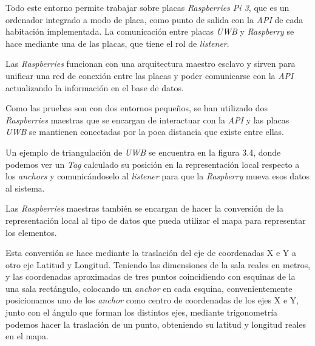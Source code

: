 Todo este entorno permite trabajar sobre placas \textit{Raspberries Pi 3}, que es un ordenador integrado a modo de placa, como punto de salida con la \textit{API} de cada habitación implementada. La comunicación entre placas \textit{UWB} y \textit{Raspberry} se hace mediante una de las placas, que tiene el rol de \textit{listener}.

Las \textit{Raspberries} funcionan con una arquitectura maestro esclavo y sirven para unificar una red de conexión entre las placas y poder comunicarse con la \textit{API} actualizando la información en el base de datos.

Como las pruebas son con dos entornos pequeños, se han utilizado dos \textit{Raspberries} maestras que se encargan de interactuar con la \textit{API} y las placas \textit{UWB} se mantienen conectadas por la poca distancia que existe entre ellas.

Un ejemplo de triangulación de \textit{UWB} se encuentra en la figura 3.4, donde podemos ver un \textit{Tag} calculado su posición en la representación local respecto a los \textit{anchors} y comunicándoselo al \textit{listener} para que la \textit{Raspberry} mueva esos datos al sistema.





Las \textit{Raspberries} maestras también se encargan de hacer la conversión de la representación local al tipo de datos que pueda utilizar el mapa para representar los elementos.

Esta conversión se hace mediante la traslación del eje de coordenadas X e Y a otro eje Latitud y Longitud. Teniendo las dimensiones de la sala reales en metros, y las coordenadas aproximadas de tres puntos coincidiendo con esquinas de la una sala rectángulo, colocando un \textit{anchor} en cada esquina, convenientemente posicionamos uno de los \textit{anchor} como centro de coordenadas de los ejes X e Y, junto con el ángulo que forman los distintos ejes, mediante trigonometría podemos hacer la traslación de un punto, obteniendo su latitud y longitud reales en el mapa. 

